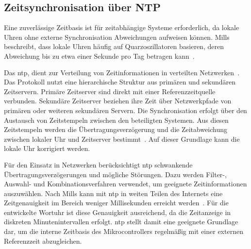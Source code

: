 \subsection{Zeitsynchronisation über NTP}
Eine zuverlässige Zeitbasis ist für zeitabhängige Systeme erforderlich, da lokale Uhren ohne externe Synchronisation Abweichungen aufweisen können.
Mills beschreibt, dass lokale Uhren häufig auf Quarzoszillatoren basieren, deren Abweichung bis zu etwa einer Sekunde pro Tag betragen kann~\cite{mills1991ntp}.

Das \gls{ntp}, dient zur Verteilung von Zeitinformationen in verteilten Netzwerken~\cite{mills1991ntp}.
Das Protokoll nutzt eine hierarchische Struktur aus primären und sekundären Zeitservern.
Primäre Zeitserver sind direkt mit einer Referenzzeitquelle verbunden.
Sekundäre Zeitserver beziehen ihre Zeit über Netzwerkpfade von primären oder weiteren sekundären Servern.
Die Synchronisation erfolgt über den Austausch von Zeitstempeln zwischen den beteiligten Systemen.
Aus diesen Zeitstempeln werden die Übertragungsverzögerung und die Zeitabweichung zwischen lokaler Uhr und Zeitserver bestimmt~\cite{mills1991ntp}.
Auf dieser Grundlage kann die lokale Uhr korrigiert werden.

Für den Einsatz in Netzwerken berücksichtigt \gls{ntp} schwankende Übertragungsverzögerungen und mögliche Störungen.
Dazu werden Filter-, Auswahl- und Kombinationsverfahren verwendet, um geeignete Zeitinformationen auszuwählen.
Nach Mills kann mit \gls{ntp} in weiten Teilen des Internets eine Zeitgenauigkeit im Bereich weniger Millisekunden erreicht werden~\cite{mills1991ntp}.
Für die entwickelte Wortuhr ist diese Genauigkeit ausreichend, da die Zeitanzeige in diskreten Minutenintervallen erfolgt.
\gls{ntp} stellt damit eine geeignete Grundlage dar, um die interne Zeitbasis des Mikrocontrollers regelmäßig mit einer externen Referenzzeit abzugleichen.
